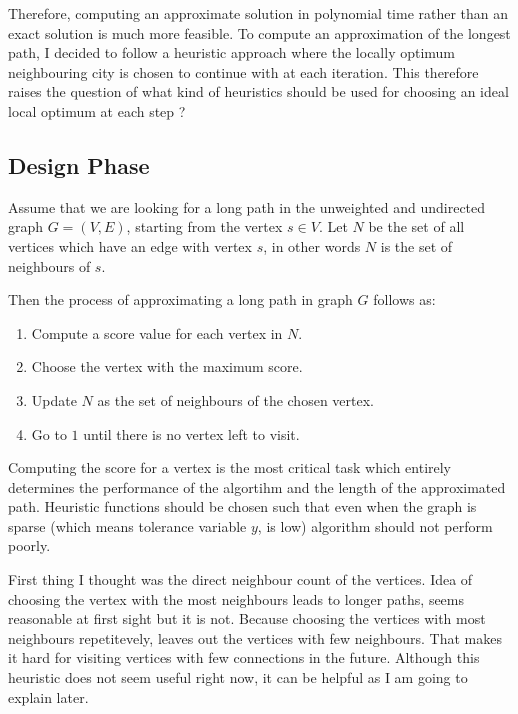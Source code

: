 \documentclass[12pt]{report}
\begin{document}
            Therefore, computing an approximate solution in polynomial time rather than an exact solution is much more feasible. To compute an approximation of the
            longest path, I decided to follow a heuristic approach where the locally optimum neighbouring city is chosen to continue with at each iteration. This therefore
            raises the question of what kind of heuristics should be used for choosing an ideal local optimum at each step ?

        \subsection{Design Phase}
            
            Assume that we are looking for a long path in the unweighted and undirected graph $G=(V,E)$, starting from the vertex $s \in V$. Let $N$ be the set of all vertices
            which have an edge with vertex $s$, in other words $N$ is the set of neighbours of $s$. 
            \newline

            Then the process of approximating a long path in graph $G$ follows as:

            \begin{enumerate}
                \item Compute a score value for each vertex in $N$.
                \item Choose the vertex with the maximum score.
                \item Update $N$ as the set of neighbours of the chosen vertex.
                \item Go to $1$ until there is no vertex left to visit.
            \end{enumerate}

            Computing the score for a vertex is the most critical task which entirely determines the performance of the algortihm and the length of the approximated path. 
            Heuristic functions should be chosen such that even when the graph is sparse (which means tolerance variable $y$, is low) algorithm should not perform poorly. 
            \newline

            First thing I thought was the direct neighbour count of the vertices. Idea of choosing the vertex with the most neighbours leads to longer paths, seems reasonable at 
            first sight but it is not. Because choosing the vertices with most neighbours repetitevely, leaves out the vertices with few neighbours. That makes it hard for visiting
            vertices with few connections in the future. Although this heuristic does not seem useful right now, it can be helpful as I am going to explain later.
\end{document}
